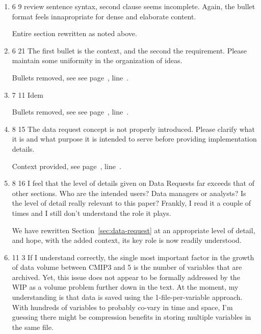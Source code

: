 \documentclass[gmd,manuscript]{copernicus}
\newcommand{\plref}[1]{see page~\pageref{p-#1}, line~\lineref{l-#1}.}
\newenvironment{answer}{\color{blue}}{}
\begin{document}
\begin{enumerate}[label=RC2-\arabic*,leftmargin=*]
  \begin{answer}
    We thank the reviewer for this useful guidance, and the entire
    Section~\ref{sec:infra-principles} has been rewritten as
    suggested, without bullets. Also, re ``changes'', \plref{RC2-14}
  \end{answer}
\item 6 9 review sentence syntax, second clause seems incomplete.
  Again, the bullet format feels innapropriate for dense and elaborate
  content.

  \begin{answer}
    Entire section rewritten as noted above.
  \end{answer}
\item 6 21 The first bullet is the context, and the second the
  requirement. Please maintain some uniformity in the organization of
  ideas.

  \begin{answer}
    Bullets removed, see \plref{RC2-16}
  \end{answer}
\item 7 11 Idem

  \begin{answer}
    Bullets removed, see \plref{RC2-17}
  \end{answer}
\item 8 15 The data request concept is not properly introduced. Please
  clarify what it is and what purpose it is intended to serve before
  providing implementation details.

  \begin{answer}
    Context provided, \plref{RC2-18}
  \end{answer}
\item 8 16 I feel that the level of details given on Data Requests far
  exceeds that of other sections. Who are the intended users? Data
  managers or analysts? Is the level of detail really relevant to this
  paper? Frankly, I read it a couple of times and I still don’t
  understand the role it plays.

  \begin{answer}
    We have rewritten Section~\ref{sec:data-request} at an appropriate
    level of detail, and hope, with the added context, its key role is
    now readily understood.
  \end{answer}
\item 11 3 If I understand correctly, the single most important factor
  in the growth of data volume between CMIP3 and 5 is the number of
  variables that are archived. Yet, this issue does not appear to be
  formally addressed by the WIP as a volume problem further down in
  the text. At the moment, my understanding is that data is saved
  using the 1-file-per-variable approach. With hundreds of variables
  to probably co-vary in time and space, I’m guessing there might be
  compression benefits in storing multiple variables in the same file.


\end{enumerate}
\end{document}
